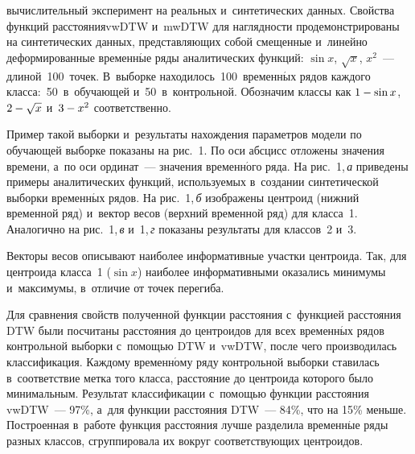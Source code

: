 \begin{multicols}{2}
\noindent
 вычислительный эксперимент на реальных и~синтетических данных. 
Свойства функций расстояния\linebreak vwDTW и~mwDTW для наглядности продемонстрированы 
на синтетических данных, представляющих собой смещенные и~линейно деформированные 
временн$\acute{\mbox{ы}}$е ряды аналитических функций: $\sin{x}$, $\sqrt{x}$, $x^2$~--- длиной~100~точек. 
В~выборке находилось~100~временн$\acute{\mbox{ы}}$х рядов каждого 
класса:~50~в~обуча\-ющей 
и~50~в~контрольной. Обозначим классы как $1 \hm- \sin{x}$, $2 \hm- \sqrt{x}$
и~$3 \hm- x^2$ соответст\-венно.
{

}

Пример такой выборки и~результаты нахождения параметров модели по обучающей выборке 
показаны на рис.~1. По оси абсцисс отложены значения времени, а~по оси ординат~--- 
значения временн$\acute{\mbox{о}}$го ряда. На рис.~1,\,\textit{а} 
приведены примеры аналитических 
функций, используемых в~создании синтетической выборки временн$\acute{\mbox{ы}}$х рядов. На 
рис.~1,\,\textit{б} изображены центроид (нижний временной ряд) и~вектор весов 
(верхний временной ряд) для класса~1. Аналогично на рис.~1,\,\textit{в}
и~1,\,\textit{г} показаны  результаты для классов~2 и~3.


Векторы весов описывают наиболее информативные участки центроида. 
Так, для центроида класса~1 ($\sin{x}$) наиболее информативными оказались минимумы 
и~максимумы, в~отличие от точек перегиба.

 Для сравнения свойств полученной функции расстояния с~функцией расстояния DTW 
 были посчитаны расстояния до центроидов для всех временн$\acute{\mbox{ы}}$х рядов контрольной выборки 
 с~по\-мощью DTW и~vwDTW, после чего производилась классификация. Каждому 
 временн$\acute{\mbox{о}}$му 
 ряду контрольной выборки ставилась в~соответствие метка того класса, расстояние 
 до центроида которого было минимальным. Результат классификации с~помощью функции 
 расстояния vwDTW~--- 97\%, а~для функции расстояния DTW~--- 84\%, что на 15\% меньше.
 Построенная в~работе функция расстояния лучше разделила временн$\acute{\mbox{ы}}$е 
 ряды разных классов, сгруппировала их вокруг соответствующих центроидов.
 

\end{multicols}
